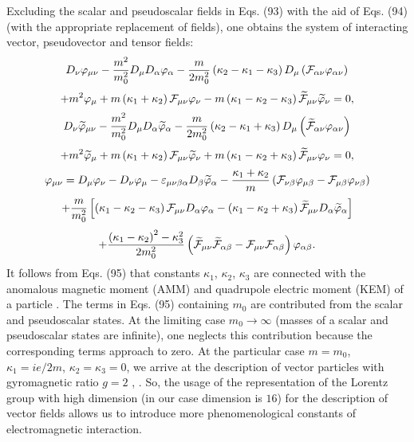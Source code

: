 \documentclass[a4paper,12pt]{article}
\begin{document}
Excluding the scalar and pseudoscalar fields in Eqs. (93) with the
aid of Eqs. (94) (with the appropriate replacement of fields), one
obtains the system of interacting vector, pseudovector and tensor
fields:
\[
D_\nu \varphi_{\mu\nu} -\frac{m^2}{m_0^2}D_\mu
D_\alpha\varphi_\alpha -\frac{m}{2m_0^2}\left(\kappa_2 -\kappa_1
-\kappa_3\right)D_\mu\left({\cal
F}_{\alpha\nu}\varphi_{\alpha\nu}\right)
\]
\[
+m^2\varphi_\mu +m\left(\kappa_1 +\kappa_2 \right){\cal
F}_{\mu\nu}\varphi_{\nu}-m\left(\kappa_1 -\kappa_2 -\kappa_3
\right)\widetilde{{\cal F}}_{\mu\nu}\widetilde{\varphi}_{\nu}=0 ,
\]
\[
D_\nu \widetilde{\varphi}_{\mu\nu} -\frac{m^2}{m_0^2}D_\mu
D_\alpha\widetilde{\varphi}_\alpha -\frac{m}{2m_0^2}\left(\kappa_2
-\kappa_1 +\kappa_3\right)D_\mu\left(\widetilde{{\cal
F}}_{\alpha\nu}\varphi_{\alpha\nu}\right)
\]
\begin{equation}
+ m^2 \widetilde{\varphi}_\mu +m\left(\kappa_1 +\kappa_2
\right){\cal F}_{\mu\nu}\widetilde{\varphi}_{\nu}+m\left(\kappa_1
-\kappa_2 +\kappa_3 \right)\widetilde{{\cal
F}}_{\mu\nu}\varphi_{\nu}=0 , \label{95}
\end{equation}
\[
\varphi_{\mu\nu}=D_\mu \varphi_\nu -D_\nu \varphi_\mu
-\varepsilon_{\mu\nu\beta\alpha}D_\beta \widetilde{\varphi}_\alpha
-\frac{\kappa_1 +\kappa_2}{m}\left( {\cal F}_{\nu\beta}\varphi_{
\mu\beta}-{\cal F}_{\mu\beta}\varphi_{ \nu\beta}\right)
\]
\[
+\frac{m}{m_0^2}\left[\left( \kappa_1 -\kappa_2
-\kappa_3\right){\cal F}_{\mu\nu }D_\alpha\varphi_\alpha-\left(
\kappa_1 -\kappa_2 +\kappa_3\right)\widetilde{{\cal F}}_{\mu\nu }
D_\alpha\widetilde{\varphi}_\alpha\right]
\]
\[
+\frac{\left(\kappa_1 -\kappa_2\right)^2
-\kappa_3^2}{2m_0^2}\left(\widetilde{{\cal F}}_{\mu\nu
}\widetilde{{\cal F}}_{\alpha\beta }-{\cal F}_{\mu\nu }{\cal
F}_{\alpha\beta}\right)\varphi_{\alpha\beta} .
\]
It follows from Eqs. (95) that constants $\kappa_1$, $\kappa_2$,
$\kappa_3$ are connected with the anomalous magnetic moment (AMM)
and quadrupole electric moment (KEM) of a particle \cite{Joung}.
The terms in Eqs. (95) containing $m_0$ are contributed from the
scalar and pseudoscalar states. At the limiting case
$m_0\rightarrow\infty$ (masses of a scalar and pseudoscalar states
are infinite), one neglects this contribution because the
corresponding terms approach to zero. At the particular case
$m=m_0$, $\kappa_1 =ie/2m$, $\kappa_2 =\kappa_3 =0$, we arrive at
the description of vector particles with gyromagnetic ratio $g=2$
\cite{Durand}, \cite{monogr}. So, the usage of the representation
of the Lorentz group with high dimension (in our case dimension is
$16$) for the description of vector fields allows us to introduce
more phenomenological constants of electromagnetic interaction.
\end{document}
